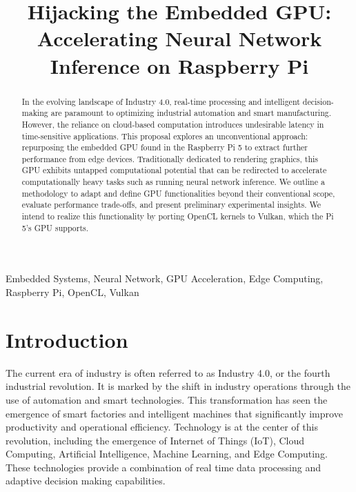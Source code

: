 \documentclass[conference]{IEEEtran}
\begin{document}
 \nocite{*}
 
 \title{Hijacking the Embedded GPU: Accelerating Neural Network Inference on Raspberry Pi\\}
 
 \author{
 }
 
 \maketitle
 
 \begin{abstract}
    In the evolving landscape of Industry 4.0, real-time processing and intelligent decision-making are 
    paramount to optimizing industrial automation and smart manufacturing. However, the reliance on 
    cloud-based computation introduces undesirable latency in time-sensitive applications. This 
    proposal explores an unconventional approach: repurposing the embedded GPU found in the Raspberry Pi 5
    to extract further performance from edge devices. Traditionally dedicated to rendering graphics, this GPU exhibits 
    untapped computational potential that can be redirected to accelerate computationally heavy tasks 
    such as running neural network inference. 
    We outline a methodology to adapt and define GPU functionalities beyond their conventional 
    scope, evaluate performance trade-offs, and present preliminary experimental insights. 
    We intend to realize this functionality by porting OpenCL kernels to Vulkan, which the Pi 5's 
    GPU supports. 
 \end{abstract}
 
 \begin{IEEEkeywords}
 Embedded Systems, Neural Network, GPU Acceleration, Edge Computing, Raspberry Pi, OpenCL, Vulkan
 \end{IEEEkeywords}
 
 \section{Introduction}

 The current era of industry is often referred to as Industry 4.0, or the fourth 
 industrial revolution. It is marked by the shift in industry operations through the 
 use of automation and smart technologies. This transformation has seen the emergence 
 of smart factories and intelligent machines that significantly improve productivity and 
 operational efficiency. Technology is at the center of this revolution, including the 
 emergence of Internet of Things (IoT), Cloud Computing, Artificial Intelligence, Machine
 Learning, and Edge Computing. These technologies provide a combination of real time data 
 processing and adaptive decision making capabilities. 
 
\end{document}
